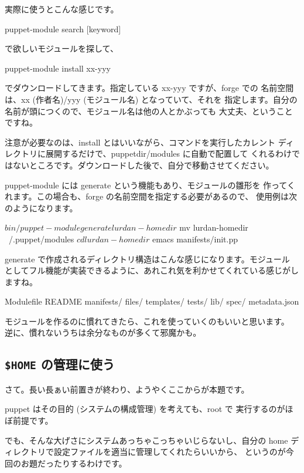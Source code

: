 \documentclass[mingoth,a4paper]{jsarticle}
\begin{document}
実際に使うとこんな感じです。

\begin{commandline}
puppet-module search [keyword]
\end{commandline}
で欲しいモジュールを探して、

\begin{commandline}
puppet-module install xx-yyy
\end{commandline}

でダウンロードしてきます。指定している xx-yyy ですが、forge での
名前空間は、xx (作者名)/yyy (モジュール名) となっていて、それを
指定します。自分の名前が頭につくので、モジュール名は他の人とかぶっても
大丈夫、ということですね。

注意が必要なのは、install とはいいながら、コマンドを実行したカレント
ディレクトリに展開するだけで、puppetdir/modules に自動で配置して
くれるわけではないところです。ダウンロードした後で、自分で移動させてください。

puppet-module には generate という機能もあり、モジュールの雛形を
作ってくれます。この場合も、forge の名前空間を指定する必要があるので、
使用例は次のようになります。

\begin{commandline}
$ bin/puppet-module generate lurdan-homedir
$ mv lurdan-homedir ~/.puppet/modules
$ cd lurdan-homedir
$ emacs manifests/init.pp
\end{commandline}

generate で作成されるディレクトリ構造はこんな感じになります。モジュール
としてフル機能が実装できるように、あれこれ気を利かせてくれている感じがし
ますね。

\begin{commandline} 
Modulefile
README
manifests/
files/
templates/
tests/
lib/
spec/
metadata.json
\end{commandline}

モジュールを作るのに慣れてきたら、これを使っていくのもいいと思います。
逆に、慣れないうちは余分なものが多くて邪魔かも。

\subsection{ {\tt \$HOME} の管理に使う}

さて。長い長ぁい前置きが終わり、ようやくここからが本題です。

puppet はその目的 (システムの構成管理) を考えても、root で
実行するのがほぼ前提です。

でも、そんな大げさにシステムあっちゃこっちゃいじらないし、自分の
home ディレクトリで設定ファイルを適当に管理してくれたらいいから、
というのが今回のお題だったりするわけです。
\end{document}
